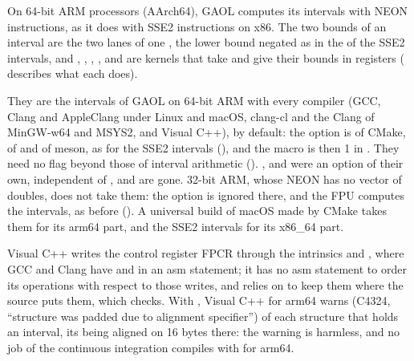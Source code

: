 On 64-bit ARM processors (AArch64), GAOL computes its intervals with NEON
instructions, as it does with SSE2 instructions on x86.\newinvfive{} The two
bounds of an interval are the two lanes of one , the lower
bound negated as in the  of the SSE2 intervals, and \code{+},
\code{-}, \code{*}, \code{/},  and  are kernels that
take and give their bounds in registers ( describes what
each does).

\medskip
They are the intervals of GAOL on 64-bit ARM with every compiler (GCC, Clang
and AppleClang under Linux and macOS, clang-cl and the Clang of MinGW-w64 and
MSYS2, and Visual C++), by default: the option is  of
CMake,  of  and  of
meson, as for the SSE2 intervals (), and the macro
 is then 1 in
. They need no flag beyond those of interval
arithmetic (). ,
 and  were an option of their
own, independent of , and are gone.\newinvfive{} 32-bit
ARM, whose NEON has no vector of doubles, does not take them: the option is
ignored there, and the FPU computes the intervals, as before
(). A universal build of macOS made by CMake takes
them for its arm64 part, and the SSE2 intervals for its x86\_64 part.

\medskip
Visual C++ writes the control register FPCR through the intrinsics
 and , where GCC and Clang
have  and  in an asm statement; it has no asm statement
to order its operations with respect to those writes, and relies on
 to keep them where the source puts them, which
 checks. With , Visual C++
for arm64 warns (C4324, ``structure was padded due to alignment specifier'')
of each structure that holds an interval, its  being
aligned on 16 bytes there: the warning is harmless, and no job of
the continuous integration compiles with  for
arm64.\newinvfive

\medskip
